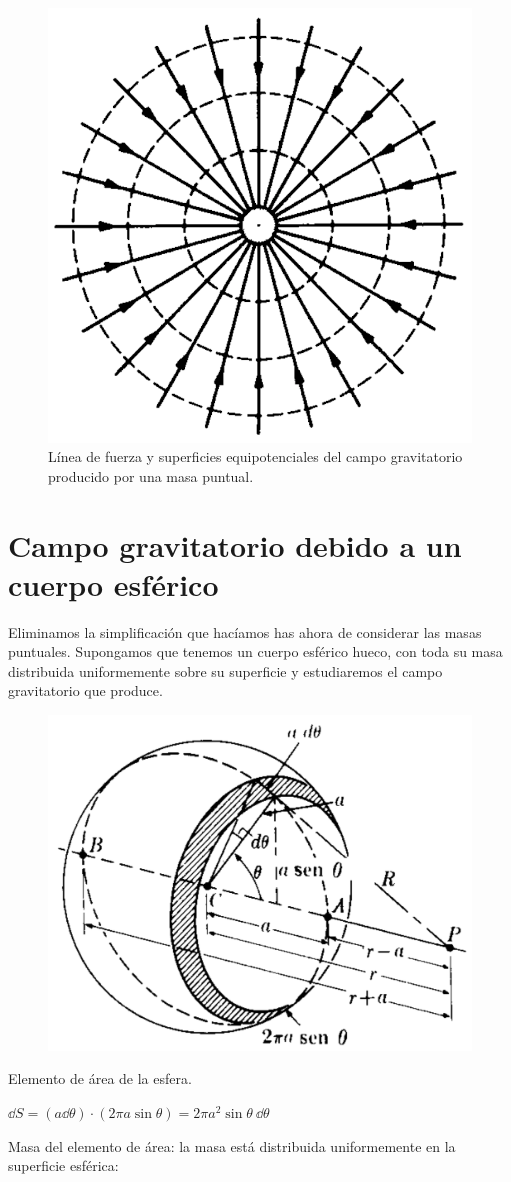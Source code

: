 \begin{figure}[H]
	\centering
	\includegraphics[width=.4\textwidth]{imagenes/imagenes14/T14IM09.png}
	\caption*{Línea de fuerza y superficies equipotenciales del campo gravitatorio producido por una masa puntual.}
\end{figure}

\section{Campo gravitatorio debido a un cuerpo esférico}

Eliminamos la simplificación que hacíamos has ahora de considerar las masas puntuales. Supongamos que tenemos un cuerpo esférico hueco, con toda su masa distribuida uniformemente sobre su superficie y estudiaremos el campo gravitatorio que produce.

\begin{figure}[H]
	\centering
	\includegraphics[width=.6\textwidth]{imagenes/imagenes14/T14IM10.png}
\end{figure}

Elemento de área de la esfera.

$\dd S= (a\dd \theta)\cdot (2\pi a \sin \theta)=2\pi a^2 \sin \theta \ \dd \theta$

Masa del elemento de área: la masa está distribuida uniformemente en la superficie esférica:

